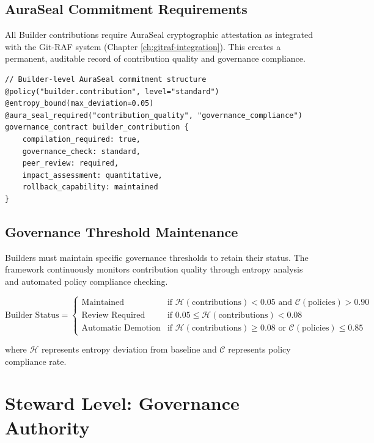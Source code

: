 \subsection{AuraSeal Commitment Requirements}

All Builder contributions require AuraSeal cryptographic attestation as integrated with the Git-RAF system (Chapter \ref{ch:gitraf-integration}). This creates a permanent, auditable record of contribution quality and governance compliance.

\begin{lstlisting}[style=riftlang, language=rift]
// Builder-level AuraSeal commitment structure
@policy("builder.contribution", level="standard")
@entropy_bound(max_deviation=0.05)
@aura_seal_required("contribution_quality", "governance_compliance")
governance_contract builder_contribution {
    compilation_required: true,
    governance_check: standard,
    peer_review: required,
    impact_assessment: quantitative,
    rollback_capability: maintained
}
\end{lstlisting}

\subsection{Governance Threshold Maintenance}

Builders must maintain specific governance thresholds to retain their status. The framework continuously monitors contribution quality through entropy analysis and automated policy compliance checking.

\begin{equation}
\text{Builder Status} = \begin{cases}
\text{Maintained} & \text{if } \mathcal{H}(\text{contributions}) < 0.05 \text{ and } \mathcal{C}(\text{policies}) > 0.90 \\
\text{Review Required} & \text{if } 0.05 \leq \mathcal{H}(\text{contributions}) < 0.08 \\
\text{Automatic Demotion} & \text{if } \mathcal{H}(\text{contributions}) \geq 0.08 \text{ or } \mathcal{C}(\text{policies}) \leq 0.85
\end{cases}
\end{equation}

where $\mathcal{H}$ represents entropy deviation from baseline and $\mathcal{C}$ represents policy compliance rate.

\section{Steward Level: Governance Authority}

